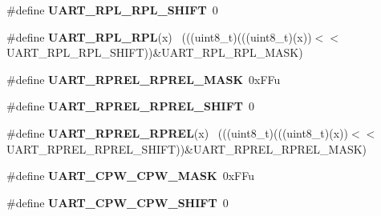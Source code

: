 \begin{DoxyCompactItemize}
\item 
\hypertarget{group___u_a_r_t___register___masks_gab08704b09eed1d6fba84472a014b3527}{}\#define {\bfseries U\+A\+R\+T\+\_\+\+R\+P\+L\+\_\+\+R\+P\+L\+\_\+\+S\+H\+I\+F\+T}~0\label{group___u_a_r_t___register___masks_gab08704b09eed1d6fba84472a014b3527}

\item 
\hypertarget{group___u_a_r_t___register___masks_gae3c9d49edbdcc7bf317fb8598f3992ac}{}\#define {\bfseries U\+A\+R\+T\+\_\+\+R\+P\+L\+\_\+\+R\+P\+L}(x)                                                ~(((uint8\+\_\+t)(((uint8\+\_\+t)(x))$<$$<$U\+A\+R\+T\+\_\+\+R\+P\+L\+\_\+\+R\+P\+L\+\_\+\+S\+H\+I\+F\+T))\&U\+A\+R\+T\+\_\+\+R\+P\+L\+\_\+\+R\+P\+L\+\_\+\+M\+A\+S\+K)\label{group___u_a_r_t___register___masks_gae3c9d49edbdcc7bf317fb8598f3992ac}

\item 
\hypertarget{group___u_a_r_t___register___masks_gaaa20f89911591351de9a68b24682c401}{}\#define {\bfseries U\+A\+R\+T\+\_\+\+R\+P\+R\+E\+L\+\_\+\+R\+P\+R\+E\+L\+\_\+\+M\+A\+S\+K}~0x\+F\+Fu\label{group___u_a_r_t___register___masks_gaaa20f89911591351de9a68b24682c401}

\item 
\hypertarget{group___u_a_r_t___register___masks_ga01024b3c3da329994c1c56242d86234a}{}\#define {\bfseries U\+A\+R\+T\+\_\+\+R\+P\+R\+E\+L\+\_\+\+R\+P\+R\+E\+L\+\_\+\+S\+H\+I\+F\+T}~0\label{group___u_a_r_t___register___masks_ga01024b3c3da329994c1c56242d86234a}

\item 
\hypertarget{group___u_a_r_t___register___masks_ga366930d2c2ccbdf888660c99969fc26a}{}\#define {\bfseries U\+A\+R\+T\+\_\+\+R\+P\+R\+E\+L\+\_\+\+R\+P\+R\+E\+L}(x)                                        ~(((uint8\+\_\+t)(((uint8\+\_\+t)(x))$<$$<$U\+A\+R\+T\+\_\+\+R\+P\+R\+E\+L\+\_\+\+R\+P\+R\+E\+L\+\_\+\+S\+H\+I\+F\+T))\&U\+A\+R\+T\+\_\+\+R\+P\+R\+E\+L\+\_\+\+R\+P\+R\+E\+L\+\_\+\+M\+A\+S\+K)\label{group___u_a_r_t___register___masks_ga366930d2c2ccbdf888660c99969fc26a}

\item 
\hypertarget{group___u_a_r_t___register___masks_ga8578e9c009c333cd34328a2954bc28c0}{}\#define {\bfseries U\+A\+R\+T\+\_\+\+C\+P\+W\+\_\+\+C\+P\+W\+\_\+\+M\+A\+S\+K}~0x\+F\+Fu\label{group___u_a_r_t___register___masks_ga8578e9c009c333cd34328a2954bc28c0}

\item 
\hypertarget{group___u_a_r_t___register___masks_gaf009ff58ad6f033852ad752a81dfe7f4}{}\#define {\bfseries U\+A\+R\+T\+\_\+\+C\+P\+W\+\_\+\+C\+P\+W\+\_\+\+S\+H\+I\+F\+T}~0\label{group___u_a_r_t___register___masks_gaf009ff58ad6f033852ad752a81dfe7f4}


\end{DoxyCompactItemize}
